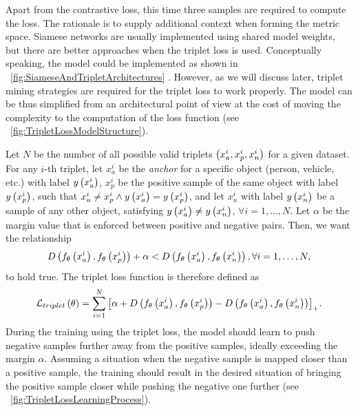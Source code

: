 Apart from the contrastive loss, this time three samples are required to compute the loss. The rationale is to supply additional context when forming the metric space. Siamese networks are usually implemented using shared model weights, but there are better approaches when the triplet loss is used. Conceptually speaking, the model could be implemented as shown in \figstr{}~\ref{fig:SiameseAndTripletArchitectures} . However, as we will discuss later, triplet mining strategies are required for the triplet loss to work properly. The model can be thus simplified from an architectural point of view at the cost of moving the complexity to the computation of the loss function (see \figstr{}~\ref{fig:TripletLossModelStructure}).

Let $N$ be the number of all possible valid triplets $\left( {x_a^i, x_p^i, x_n^i} \right)$ for a given dataset. For any $i$-th triplet, let $x_a^i$ be the \emph{anchor} for a specific object (person, vehicle, etc.) with label ${y} \left( x_a^i \right)$, $x_p^i$ be the positive sample of the same object with label ${y} \left( x_p^i \right)$, such that $x_a^i \neq x_p^i \land {y} \left( x_a^i \right) = {y} \left( x_p^i \right)$, and let $x_n^i$ with label ${y} \left( x_n^i \right)$ be a sample of any other object, satisfying ${y} \left( x_a^i \right) \neq {y} \left( x_n^i \right)$, $\forall i = 1, \dots, N$. Let $\alpha$ be the margin value that is enforced between positive and negative pairs. Then, we want the relationship~\cite{schroff2015facenet}
\begin{equation}
    \label{eq:TripletDistanceConstraint}
    {D} \left( {f_\theta} \left( x_a^i \right), {f_\theta} \left( x_p^i \right) \right) + \alpha < {D} \left( {f_\theta} \left( x_a^i \right), {f_\theta} \left( x_n^i \right) \right), \forall i = 1, \dots, N,
\end{equation}
to hold true. The triplet loss function is therefore defined as~\cite{schroff2015facenet}
\begin{equation}
    \label{eq:TripletLoss}
    {\mathcal{L}_{triplet}} \left( \theta \right) =
    \sum_{i = 1}^{N}
    {\left[ {
        \alpha +
        {D} \left( {f_\theta} \left( x_a^i \right), {f_\theta} \left( x_p^i \right) \right) -
        {D} \left( {f_\theta} \left( x_a^i \right), {f_\theta} \left( x_n^i \right) \right)
    } \right]}_+.
\end{equation}
During the training using the triplet loss, the model should learn to push negative samples further away from the positive samples, ideally exceeding the margin $\alpha$. Assuming a situation when the negative sample is mapped closer than a positive sample, the training should result in the desired situation of bringing the positive sample closer while pushing the negative one further (see \figstr{}~\ref{fig:TripletLossLearningProcess}).


